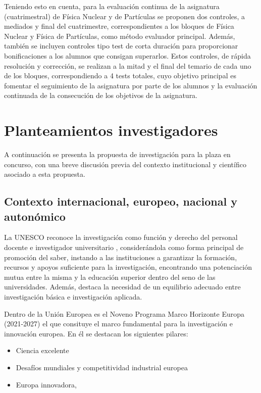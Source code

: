 \documentclass[a4paper,12pt,twoside]{article}
\begin{document}
Teniendo esto en cuenta, para la evaluación continua de la asignatura (cuatrimestral) de Física Nuclear y de Partículas se proponen dos controles, a mediados y final del cuatrimestre, correspondientes a los bloques de Física Nuclear y Física de Partículas, como método evaluador principal. Además, también se incluyen controles tipo test de corta duración para proporcionar bonificaciones a los alumnos que consigan superarlos. Estos controles, de rápida resolución y corrección, se realizan a la mitad y el final del temario de cada uno de los bloques, correspondiendo a 4 tests totales, cuyo objetivo principal es fomentar el seguimiento de la asignatura por parte de los alumnos y la evaluación continuada de la consecución de los objetivos de la asignatura.

\section{Planteamientos investigadores}

A continuación se presenta la propuesta de investigación para la plaza en concurso, con una breve discusión previa del contexto institucional y científico asociado a esta propuesta.

\subsection{Contexto internacional, europeo, nacional y autonómico}

La UNESCO reconoce la investigación como función y derecho del personal docente e investigador universitario \cite{unesco}, considerándola como forma principal de promoción del saber, instando a las instituciones a garantizar la formación, recursos y apoyos suficiente para la investigación, encontrando una potenciación mutua entre la misma y la educación superior dentro del seno de las universidades. Además, destaca la necesidad de un equilibrio adecuado entre investigación básica e investigación aplicada.

Dentro de la Unión Europea es el Noveno Programa Marco Horizonte Europa (2021-2027)\cite{horizonte} el que consituye el marco fundamental para la investigación e innovación europea. En él se destacan los siguientes pilares:

\begin{itemize}
\item Ciencia  excelente
\item Desafíos mundiales y competitividad industrial europea
\item Europa innovadora,
\end{itemize}
\end{document}
